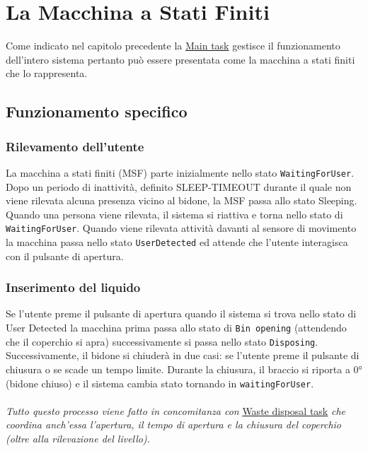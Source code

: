 \documentclass{report}
\begin{document}
\chapter{La Macchina a Stati Finiti}
Come indicato nel capitolo precedente la \hyperref[fig:main-task]{Main task} gestisce il funzionamento dell'intero sistema pertanto può essere presentata come la macchina a stati finiti che lo rappresenta. 

\section{Funzionamento specifico}

\subsection{Rilevamento dell'utente}
\label{sub:utente}
\par {
La macchina a stati finiti (MSF) parte inizialmente nello stato \texttt{WaitingForUser}. Dopo un periodo di inattività, definito SLEEP-TIMEOUT durante il quale non viene rilevata alcuna presenza vicino al bidone, la MSF passa allo stato Sleeping. Quando una persona viene rilevata, il sistema si riattiva e torna nello stato di \texttt{WaitingForUser}.
Quando viene rilevata attività davanti al sensore di movimento la macchina passa nello stato \texttt{UserDetected} ed attende che l'utente interagisca con il pulsante di apertura.
}
\subsection{Inserimento del liquido}
\par {
Se l'utente preme il pulsante di apertura quando il sistema si trova nello stato di User Detected la macchina prima passa allo stato di \texttt{Bin opening} (attendendo che il coperchio si apra) successivamente si passa nello stato \texttt{Disposing}. Successivamente, il bidone si chiuderà in due casi: se l'utente preme il pulsante di chiusura o se scade un tempo limite. Durante la chiusura, il braccio si riporta a 0° (bidone chiuso) e il sistema cambia stato tornando in \texttt{waitingForUser}.\\ \\
\textit{
Tutto questo processo viene fatto in concomitanza con} \hyperref[fig:waste-task]{Waste disposal task} \textit{che coordina anch'essa l'apertura, il tempo di apertura e la chiusura del coperchio (oltre alla rilevazione del livello).
}
}
\end{document}
